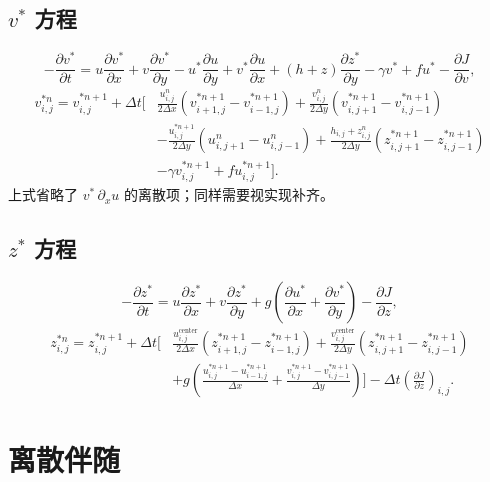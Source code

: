\documentclass[12pt,a4paper,twoside]{article}
\begin{document}
\subsection*{$v^*$ 方程}
\[
-\frac{\partial v^*}{\partial t}
= u\frac{\partial v^*}{\partial x}
+ v\frac{\partial v^*}{\partial y}
- u^*\frac{\partial u}{\partial y}
+ v^* \frac{\partial u}{\partial x}
+ (h+z)\frac{\partial z^*}{\partial y}
- \gamma v^*
+ f u^*
- \frac{\partial J}{\partial v},
\]
\begin{equation}
\begin{aligned}
v_{i,j}^{*n} = v_{i,j}^{*n+1} + \Delta t \bigg[
& \frac{u_{i,j}^n}{2\Delta x}
\left( v_{i+1,j}^{*n+1} - v_{i-1,j}^{*n+1} \right)
+ \frac{v_{i,j}^n}{2\Delta y}
\left( v_{i,j+1}^{*n+1} - v_{i,j-1}^{*n+1} \right) \\
& - \frac{u_{i,j}^{*n+1}}{2\Delta y}
\left( u_{i,j+1}^n - u_{i,j-1}^n \right)
+ \frac{h_{i,j}+z_{i,j}^n}{2\Delta y}
\left( z_{i,j+1}^{*n+1} - z_{i,j-1}^{*n+1} \right) \\
& - \gamma v_{i,j}^{*n+1}
+ f u_{i,j}^{*n+1}
\bigg].
\end{aligned}
\end{equation}
上式省略了 $v^* \,\partial_x u$ 的离散项；同样需要视实现补齐。

\subsection*{$z^*$ 方程}
\[
-\frac{\partial z^*}{\partial t}
= u\frac{\partial z^*}{\partial x}
+ v\frac{\partial z^*}{\partial y}
+ g\left(
\frac{\partial u^*}{\partial x}
+ \frac{\partial v^*}{\partial y}
\right)
- \frac{\partial J}{\partial z},
\]
\begin{equation}
\begin{aligned}
z_{i,j}^{*n} = z_{i,j}^{*n+1} + \Delta t \bigg[
& \frac{u_{i,j}^{\text{center}}}{2\Delta x}
\left( z_{i+1,j}^{*n+1} - z_{i-1,j}^{*n+1} \right)
+ \frac{v_{i,j}^{\text{center}}}{2\Delta y}
\left( z_{i,j+1}^{*n+1} - z_{i,j-1}^{*n+1} \right) \\
& + g \left(
\frac{u_{i,j}^{*n+1} - u_{i-1,j}^{*n+1}}{\Delta x}
+ \frac{v_{i,j}^{*n+1} - v_{i,j-1}^{*n+1}}{\Delta y}
\right)
\bigg]
- \Delta t \left( \frac{\partial J}{\partial z} \right)_{i,j}.
\end{aligned}
\end{equation}

\section{离散伴随}
\end{document}

